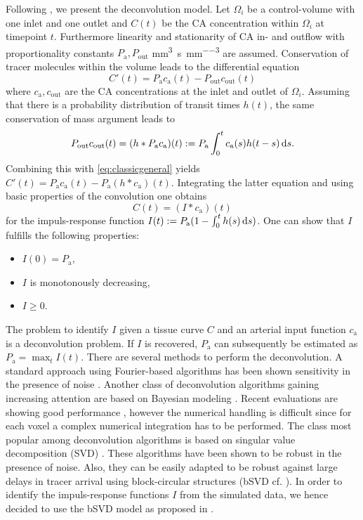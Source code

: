 \documentclass[paper=a4, fontsize=12pt,parskip=half,headings=small]{scrartcl}
\newcommand{\ca}{c_\mathrm{a}}
\newcommand{\cout}{c_{\mathrm{out}}}
\newcommand{\Pa}{P_{\mathrm{a}}}
\newcommand{\Pout}{P_{\mathrm{out}}}
\newcommand{\siP}{\cubic\milli\meter\per\second\per\cubic\milli\meter}
\begin{document}
	Following \cite{sourbron13}, we present the deconvolution model.
	Let $\Omega_i$ be a control-volume with one inlet and one outlet and $C(t)$ be the CA concentration within $\Omega_i$ at timepoint $t$.
	Furthermore linearity and stationarity of CA in- and outflow with proportionality constants $\Pa,\Pout$ \si{\siP} are assumed.
	Conservation of tracer molecules within the volume leads to the differential equation 
	\begin{equation}
		C'(t) = \Pa\ca(t) - \Pout\cout(t)
		\label{eq:classicgeneral}
	\end{equation}
	where $\ca,\cout$ are the CA concentrations at the inlet and outlet of $\Omega_i$. 	
	Assuming that there is a probability distribution of transit times $h(t)$, the same conservation of mass argument leads to
	\[
		\Pout\cout(t) = (h*\Pa\ca)(t) := \Pa\int_0^t \ca(s) h(t-s) \diffint s.
	\]
	Combining this with \eqref{eq:classicgeneral} yields $C'(t) = \Pa\ca(t)-\Pa (h*\ca)(t)$.
	Integrating the latter equation and using basic properties of the convolution one obtains
	\begin{equation}
		C(t) = (I*\ca)(t)
		\label{eq:conv}
	\end{equation}
	for the impuls-response function $I(t) := \Pa(1-\int_0^t h(s) \diffint s)$.
	One can show that $I$ fulfills the following properties:
	\begin{itemize}
		\item $I(0) = \Pa$,
		\item $I$ is monotonously decreasing,
		\item $I\ge 0$.		
	\end{itemize}
	The problem to identify $I$ given a tissue curve $C$ and an arterial input function $\ca$ is a deconvolution problem.
	If $I$ is recovered, $\Pa$ can subsequently be estimated as $\Pa = \max_{t} I(t)$.
	There are several methods to perform the deconvolution.
	A standard approach using Fourier-based algorithms has been shown sensitivity in the presence of noise \cite{wirestam00,ostergaard96}.
	Another class of deconvolution algorithms gaining increasing attention are based on Bayesian modeling \cite{boutelier12,mouridsen06}.
	Recent evaluations are showing good performance \cite{sasaki13}, however the numerical handling is difficult since for each voxel a complex numerical integration has to be performed.
	The class most popular among deconvolution algorithms is based on singular value decomposition (SVD) \cite{ostergaard96}.
	These algorithms have been shown to be robust in the presence of noise.
	Also, they can be easily adapted to be robust against large delays in tracer arrival using block-circular structures (bSVD cf. \cite{wu03}).
	In order to identify the impuls-response functions $I$ from the simulated data, we hence decided to use the bSVD model as proposed in \cite{wu03}.
\end{document}
